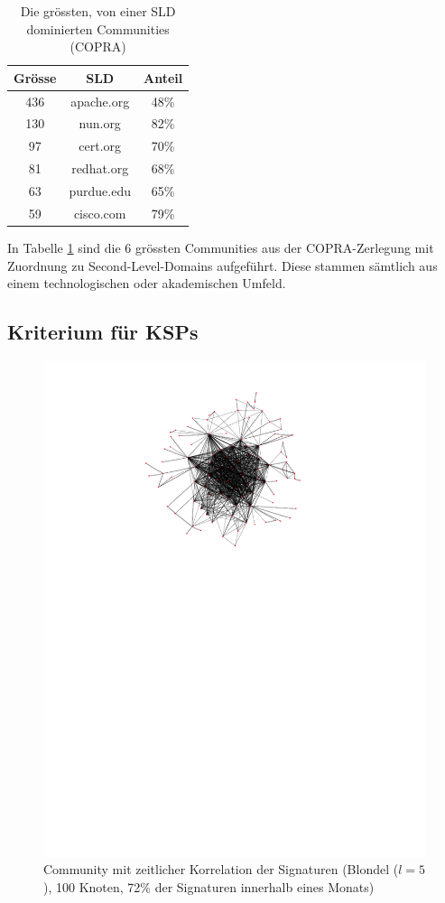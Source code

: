 \begin{table}
  \centering
  \begin{tabular}{c|c|c}
    Gr\"osse & SLD & Anteil \\
    \hline
    436 & apache.org & 48\% \\
    130 & nun.org & 82\% \\
    97 & cert.org & 70\% \\
    81 & redhat.org & 68\% \\
    63 & purdue.edu & 65\% \\
    59 & cisco.com & 79\% 
  \end{tabular}
  \caption{Die gr\"ossten, von einer SLD dominierten Communities
    (COPRA)}
  \label{tab:ass-examples}
\end{table}
In Tabelle \ref{tab:ass-examples} sind die 6 gr\"ossten Communities
aus der COPRA-Zerlegung mit Zuordnung zu Second-Level-Domains
aufgef\"uhrt. Diese stammen s\"amtlich aus einem technologischen oder
akademischen Umfeld.

\subsection{Kriterium f\"ur KSPs}
\label{sec:kriterium-fur-ksps}

\begin{figure}[th!]
  \centering
  \includegraphics[scale=1.5]{images/subgraph-label-time-fa62cc57cd35e9f90b85435efc407ad5.pdf}
  \caption{Community mit zeitlicher Korrelation der Signaturen
    (Blondel ($l=5$),
    100 Knoten, 72\% der Signaturen innerhalb eines Monats)}
  \label{fig:time-corr-com-normal}
\end{figure}

